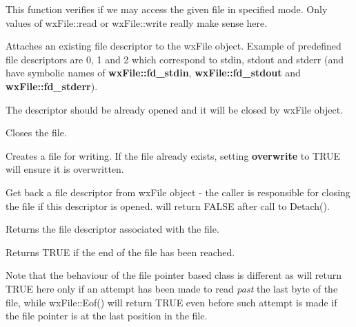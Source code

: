 This function verifies if we may access the given file in specified mode. Only
values of wxFile::read or wxFile::write really make sense here.

\label{wxfileattach}


Attaches an existing file descriptor to the wxFile object. Example of predefined
file descriptors are 0, 1 and 2 which correspond to stdin, stdout and stderr (and
have symbolic names of {\bf wxFile::fd\_stdin}, {\bf wxFile::fd\_stdout} and {\bf wxFile::fd\_stderr}).

The descriptor should be already opened and it will be closed by wxFile
object.

\label{wxfileclose}


Closes the file.

\label{wxfilecreate}


Creates a file for writing. If the file already exists, setting {\bf overwrite} to TRUE
will ensure it is overwritten.

\label{wxfiledetach}


Get back a file descriptor from wxFile object - the caller is responsible for closing the file if this
descriptor is opened.  will return FALSE after call to Detach().

\label{wxfilefd}


Returns the file descriptor associated with the file.

\label{wxfileeof}


Returns TRUE if the end of the file has been reached.

Note that the behaviour of the file pointer based class 
 is different as  
will return TRUE here only if an attempt has been made to read 
{\it past} the last byte of the file, while wxFile::Eof() will return TRUE
even before such attempt is made if the file pointer is at the last position
in the file.

